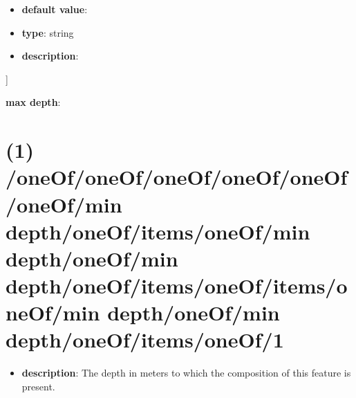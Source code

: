 \begin{itemize}[leftmargin=2em]\item {\bf default value}: 
\item {\bf type}: string
\item {\bf description}: 
\end{itemize}]\item {\bf max depth}: \section{(1) /oneOf/oneOf/oneOf/oneOf/oneOf/oneOf/min depth/oneOf/items/oneOf/min depth/oneOf/min depth/oneOf/items/oneOf/items/oneOf/min depth/oneOf/min depth/oneOf/items/oneOf/1}
\begin{itemize}[leftmargin=1em]\item {\bf description}: The depth in meters to which the composition of this feature is present.
\end{itemize}
